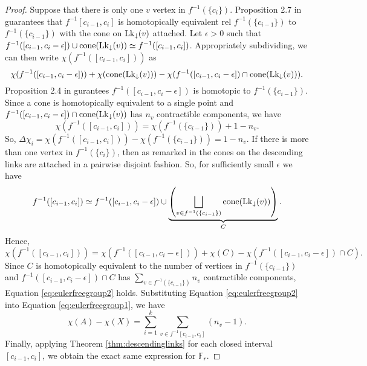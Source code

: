 \begin{proof}
    Suppose that there is only one \(v\) vertex in \(f^{-1}(\{c_i\})\). 
    Proposition 2.7 in \cite{Bestvina2008PL} guarantees that 
    \(f^{-1}[c_{i-1}, c_i]\) is homotopically equivalent rel \(f^{-1}(\{c_{i-1}\})\) to \(f^{-1}(\{c_{i-1}\})\)
    with the cone on \(\mathrm{Lk}_{\downarrow}(v)\) attached. 
    Let \(\epsilon > 0\) such that \(f^{-1}([c_{i-1}, c_i - \epsilon])\cup \mathrm{cone}(\mathrm{Lk}_{\downarrow}(v)) \simeq f^{-1}([c_{i-1}, c_i])\).
    Appropriately subdividing, we can then write \(\chi(f^{-1}([c_{i-1}, c_i]))\) as
    \[
        \chi(f^{-1}([c_{i-1}, c_i - \epsilon])) + \chi(\mathrm{cone}(\mathrm{Lk}_{\downarrow}(v))) - \chi(f^{-1}([c_{i-1}, c_i - \epsilon]) \cap \mathrm{cone}(\mathrm{Lk}_{\downarrow}(v))).
    \]
    Proposition 2.4 in \cite{Bestvina2008PL} gurantees \(f^{-1}([c_{i-1}, c_i - \epsilon])\) is homotopic to \(f^{-1}(\{c_{i-1}\})\).
    Since a cone is homotopically equivalent to a single point and \(f^{-1}([c_{i-1}, c_i - \epsilon]) \cap \mathrm{cone}(\mathrm{Lk}_{\downarrow}(v))\) has \(n_v\) contractible components,
    we have
    \[
    \chi(f^{-1}([c_{i-1}, c_i])) = \chi(f^{-1}(\{c_{i-1}\})) + 1 - n_v.
    \]
    So, \(\Delta\chi_i = \chi(f^{-1}([c_{i-1}, c_i])) - \chi(f^{-1}(\{c_{i-1}\})) = 1 - n_v\).
    If there is more than one vertex in \(f^{-1}(\{c_i\})\), then as remarked in \cite{Bestvina2008PL}
    the cones on the descending links are attached in a pairwise disjoint fashion.
    So, for sufficiently small \(\epsilon\) we have 
    \[
        f^{-1}([c_{i-1}, c_i]) \simeq f^{-1}([c_{i-1}, c_i - \epsilon]) \cup \underbrace{\left(\bigsqcup_{v \in f^{-1}(\{c_{i-1}\})}\mathrm{cone}(\mathrm{Lk}_{\downarrow}(v))\right)}_{C}.
    \]
    Hence,
    \(\chi(f^{-1}([c_{i-1}, c_i])) = \chi(f^{-1}([c_{i-1}, c_i - \epsilon])) + \chi(C) - \chi(f^{-1}([c_{i-1}, c_i - \epsilon]) \cap C).\)
    Since \(C\) is homotopically equivalent to the number of vertices in \(f^{-1}(\{c_{i-1}\})\)
    and \(f^{-1}([c_{i-1}, c_i - \epsilon]) \cap C\) has \(\sum_{v \in f^{-1}(\{c_{i-1}\})} n_v\) contractible components,
    Equation \ref{eq:eulerfreegroup2} holds.
    Substituting Equation \ref{eq:eulerfreegroup2} into Equation \ref{eq:eulerfreegroup1}, we have
    \[
        \chi(A) - \chi(X) = \sum_{i=1}^k \sum_{v \in f^{-1}[c_{i-1}, c_i]} (n_v - 1).
    \]
    Finally, applying Theorem \ref{thm:descendinglinks} for each closed interval \([c_{i-1}, c_i]\), 
    we obtain the exact same expression for \(\mathbb{F}_r\).
\end{proof}
